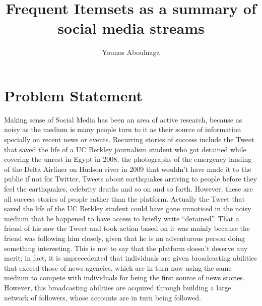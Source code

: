 \documentclass[11pt]{llncs} %
\title{Frequent Itemsets as a summary of social media streams}
\author{Younos Aboulnaga\inst{1}}
\institute{David R. Cheriton School of Computer Science, University of Waterloo, Waterloo, ON, Canada \email{yaboulna@uwaterloo.ca}}
\begin{document}
\maketitle
\section{Problem Statement}
Making sense of Social Media has been an area of active research, because as noisy as the medium is many people turn to it as their source of information specially on recent news or events. Recurring stories of success include the Tweet that saved the life of a UC Berkley journalism student who got detained while covering the unrest in Egypt in 2008, the photographs of the emergency landing of the Delta Airliner on Hudson river in 2009 that wouldn't have made it to the public if not for Twitter, Tweets about earthquakes arriving to people before they feel the earthquakes, celebrity deaths and so on and so forth. However, these are all success stories of people rather than the platform. Actually the Tweet that saved the life of the UC Berkley student could have gone unnoticed in the noisy medium that he happened to have access to briefly write ``detained''. That a friend of his saw the Tweet and took action based on it was mainly because the friend was following him closely, given that he is an adventurous person doing something interesting. This is not to say that the platform doesn't deserve any merit; in fact, it is unprecedented that individuals are given broadcasting abilities that exceed those of news agencies, which are in turn now using the same medium to compete with individuals for being the first source of news stories. However, this broadcasting abilities are acquired through building a large network of followers, whose accounts are in turn being followed. 
\end{document}
